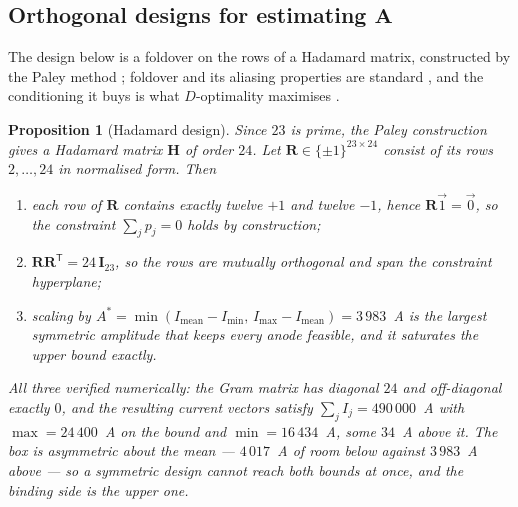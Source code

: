 \documentclass[11pt,a4paper]{article}
\newcommand{\vect}[1]{\mathbf{#1}}
\theoremstyle{plain}
\newtheorem{proposition}{Proposition}
\theoremstyle{definition}
\theoremstyle{remark}
\begin{document}
\subsection{Orthogonal designs for estimating $\vect{A}$}
\label{sec:hadamard}

The design below is a foldover on the rows of a Hadamard matrix, constructed by
the Paley method \cite{hedayat}; foldover and its aliasing properties are
standard \cite{bhh}, and the conditioning it buys is what $D$-optimality
maximises \cite{atkinson}.

\begin{proposition}[Hadamard design]
\label{prop:hadamard}
Since $23$ is prime, the Paley construction gives a Hadamard matrix
$\vect{H}$ of order $24$. Let $\vect{R} \in \{\pm1\}^{23\times24}$ consist of
its rows $2,\dots,24$ in normalised form. Then
\begin{enumerate}
\item each row of $\vect{R}$ contains exactly twelve $+1$ and twelve $-1$, hence
$\vect{R}\vec{1} = \vec{0}$, so the constraint $\sum_j p_j = 0$
holds \emph{by construction};
\item $\vect{R}\vect{R}^{\mathsf{T}} = 24\,\vect{I}_{23}$, so the rows are
mutually orthogonal and span the constraint hyperplane;
\item scaling by
$A^{*} = \min(I_{\mathrm{mean}}-I_{\min},\,I_{\max}-I_{\mathrm{mean}}) = 3\,983$~A
is the largest symmetric amplitude that keeps every anode feasible, and it
saturates the upper bound exactly.
\end{enumerate}
\textnormal{All three verified numerically: the Gram matrix has diagonal $24$
and off-diagonal exactly $0$, and the resulting current vectors satisfy
$\sum_j I_j = 490\,000$~A with $\max = 24\,400$~A on the bound and
$\min = 16\,434$~A, some $34$~A above it. The box is asymmetric about the mean
--- $4\,017$~A of room below against $3\,983$~A above --- so a symmetric design
cannot reach both bounds at once, and the binding side is the upper one.}
\end{proposition}
\end{document}
